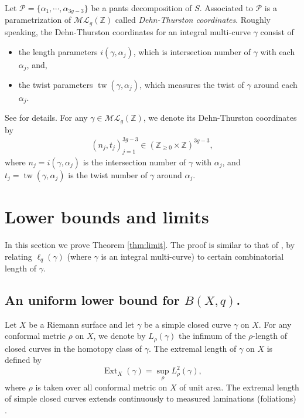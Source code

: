 \documentclass{amsart}
\theoremstyle{plain}
\theoremstyle{definition}
\numberwithin{equation}{section}
\newcommand{\ML}{\mathcal{ML}_g}
\begin{document}
Let  $\mathcal{P}=\{\alpha_1, \cdots, \alpha_{3g-3}\}$  be a pants decomposition of  $S$. 
Associated to $\mathcal{P}$ is a parametrization of $\ML(\mathbb{Z})$ called \emph{Dehn-Thurston coordinates}. Roughly speaking, the Dehn-Thurston coordinates
 for an integral multi-curve $\gamma$ consist of
 \begin{itemize}
   \item the length parameters $i(\gamma, \alpha_j)$, which is intersection  number
   of $\gamma$ with each $\alpha_j$, and,
   \item the twist parameters $\operatorname{tw}(\gamma, \alpha_j)$, which measures the twist of $\gamma$ around each $\alpha_j$.
 \end{itemize}
See \cite{PH} for details. 
For any $\gamma\in \ML(\mathbb{Z})$, we
denote its Dehn-Thurston coordinates by
\begin{eqnarray*}
 \left( n_j, t_j\right)_{j=1}^{3g-3} \in \left( \mathbb{Z}_{\geq 0} \times \mathbb{Z} \right)^{3g-3},
\end{eqnarray*}
where $n_j=i(\gamma, \alpha_j)$ is the intersection number of $\gamma$ with $\alpha_j$,
and $t_j=\operatorname{tw}(\gamma, \alpha_j)$ is the twist number of $\gamma$ around $\alpha_j$.  



\section{Lower bounds and limits}\label{sec:limit}

In this section we prove Theorem \ref{thm:limit}. 
The proof is similar to that of \cite[Proposition 3.6]{Mir2008},
by relating $\ell_q(\gamma)$ (where $\gamma$ is an integral multi-curve)
to certain combinatorial length of $\gamma$. 

\subsection{An uniform lower bound for $B(X,q)$.}
Let $X$ be a Riemann surface and let $\gamma$ be a simple closed curve $\gamma$ on $X$. For any conformal metric $\rho$ on $X$, we denote by $L_\rho(\gamma)$ the infimum of the $\rho$-length of closed curves in the homotopy class of $\gamma$.
The extremal length of  $\gamma$ on $X$ is defined by 
$$\operatorname{Ext}_X(\gamma) = \sup_\rho L^2_\rho(\gamma),$$
where $\rho$ is taken over all conformal metric on $X$ of unit area.  The extremal length of simple closed curves extends continuously to measured laminations (foliations) \cite[Proposition 3]{Kerckhoff}.  
\end{document}
